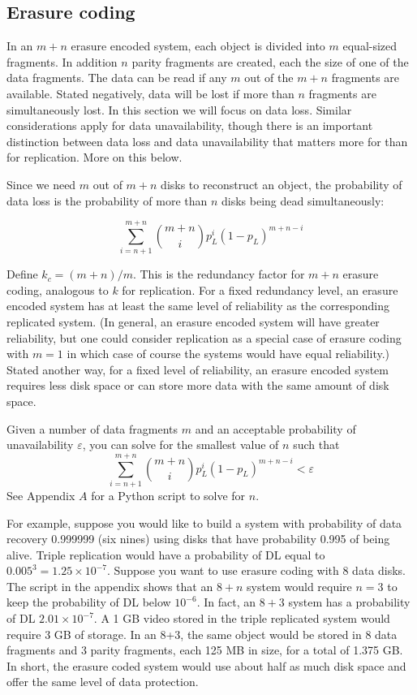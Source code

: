 \subsection{Erasure coding}

In an $m+n$ erasure encoded system, each object is divided into $m$ equal-sized fragments. In addition $n$ parity fragments are created, each the size of one of the data fragments. The data can be read if any $m$ out of the $m+n$ fragments are available. Stated negatively, data will be lost if more than $n$ fragments are simultaneously lost. In this section we will focus on data loss. Similar considerations apply for data unavailability, though there is an important distinction between data loss and data unavailability that matters more for than for replication. More on this below.

Since we need $m$ out of $m+n$ disks to reconstruct an object, the probability of data loss is the probability of more than $n$ disks being dead simultaneously:

\begin{equation}
\sum_{i=n+1}^{m+n} {m+n \choose i} p_L^i (1-p_L)^{m+n-i} \label{ecfailure1}
\end{equation}

Define $k_c = (m+n)/m$. This is the redundancy factor for $m+n$ erasure coding, analogous to $k$ for replication. For a fixed redundancy level, an erasure encoded system has at least the same level of reliability as the corresponding replicated system. (In general, an erasure encoded system will have greater reliability, but one could consider replication as a special case of erasure coding with $m = 1$ in which case of course the systems would have equal reliability.) Stated another way, for a fixed level of reliability, an erasure encoded system requires less disk space or can store more data with the same amount of disk space.

Given a number of data fragments $m$ and an acceptable probability of unavailability $\varepsilon$, you can solve for the smallest value of $n$ such that
\begin{equation}
\sum_{i=n+1}^{m+n} {m+n \choose i} p_L^i (1-p_L)^{m+n-i} < \varepsilon \label{ecfailure2}
\end{equation}
See Appendix $A$ for a Python script to solve for $n$. 

For example, suppose you would like to build a system with probability of data recovery 0.999999 (six nines) using disks that have probability 0.995 of being alive. Triple replication would have a probability of DL equal to $0.005^3 = 1.25 \times 10^{-7}$. Suppose you want to use erasure coding with 8 data disks. The script in the appendix shows that an $8+n$ system would require $n=3$ to keep the probability of DL below $10^{-6}$. In fact, an $8+3$ system has a probability of DL $2.01 \times 10^{-7}$. A 1 GB video stored in the triple replicated system would require 3 GB of storage. In an 8+3, the same object would be stored in 8 data fragments and 3 parity fragments, each 125 MB in size, for a total of 1.375 GB. In short, the erasure coded system would use about half as much disk space and offer the same level of data protection.

